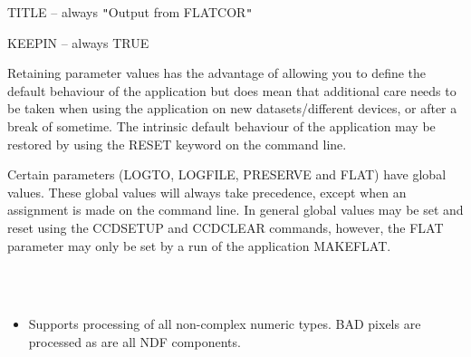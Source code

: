\documentclass[twoside,11pt]{article}
\newcommand{\htmlref}[2]{#1}
\renewcommand{\_}{\texttt{\symbol{95}}}
\newcommand{\qt}[1]{{\tt "}#1{\tt "}}
\newcommand{\xroutine}[1]{\htmlref{{\sc #1}}{#1}}
\newcommand{\sstimplementationstatus}[1]{
   \item[{Implementation Status:}] \mbox{} \\[1.3ex] #1}
\newcommand{\sstitemlist}[1]{
  \mbox{} \\
  \vspace{-3.5ex}
  \begin{itemize}
     #1
  \end{itemize}
}
\newcommand{\sstitem}{\item}
\newcommand{\sstimplementationstatus}[1]{
      \item[Implementation Status:] #1
   }
\newcommand{\sstitemlist}[1]{
      \begin{itemize}
         #1
      \end{itemize}
      \\
   }
\newcommand{\sstitem}{\item}
\begin{document}
{{{         \sstitem
            TITLE   -- always \qt{Output from FLATCOR}

         \sstitem
            KEEPIN  -- always TRUE

      }
      Retaining parameter values has the advantage of allowing you to
      define the default behaviour of the application but does mean
      that additional care needs to be taken when using the application
      on new datasets/different devices, or after a break of sometime.
      The intrinsic default behaviour of the application may be
      restored by using the RESET keyword on the command line.

      Certain parameters (LOGTO, LOGFILE, PRESERVE and FLAT) have
      global values. These global values will always take precedence,
      except when an assignment is made on the command line.  In general
      global values may be set and reset using the \xroutine{CCDSETUP} and
      \xroutine{CCDCLEAR} commands, however, the FLAT parameter may only be set by
      a run of the application \xroutine{MAKEFLAT}.
   }
   \sstimplementationstatus{
      \sstitemlist{

         \sstitem
         Supports processing of all non-complex numeric types.
           BAD pixels are processed as are all NDF components.
      }
   }
}
\end{document}
